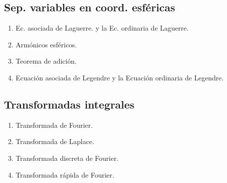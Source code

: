 \subsection{Sep. variables en coord. esféricas}

\begin{enumerate}[label=4.5.\arabic*]
\item Ec. asociada de Laguerre. y la Ec. ordinaria de Laguerre.
\item Armónicos esféricos.
\item Teorema de adición.
\item Ecuación asociada de Legendre y la Ecuación ordinaria de Legendre.
\end{enumerate}

\subsection{Transformadas integrales}

\begin{enumerate}[label=4.6.\arabic*]
\item Transformada de Fourier.
\item Transformada de Laplace.
\item Transformada discreta de Fourier.
\item Transformada rápida de Fourier.
\end{enumerate}



